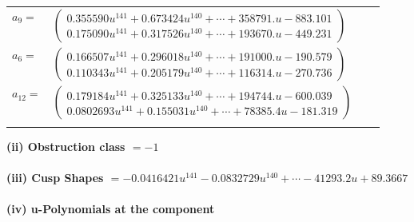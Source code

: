 \documentclass[1p]{elsarticle_modified}
\theoremstyle{definition}
\begin{document}
\begin{tabular}{m{7pt} m{180pt} m{7pt} m{180pt} }
\flushright $a_{9}=$&$\begin{pmatrix}0.355590 u^{141}+0.673424 u^{140}+\cdots+358791. u-883.101\\0.175090 u^{141}+0.317526 u^{140}+\cdots+193670. u-449.231\end{pmatrix}$ \\
\flushright $a_{6}=$&$\begin{pmatrix}0.166507 u^{141}+0.296018 u^{140}+\cdots+191000. u-190.579\\0.110343 u^{141}+0.205179 u^{140}+\cdots+116314. u-270.736\end{pmatrix}$ \\
\flushright $a_{12}=$&$\begin{pmatrix}0.179184 u^{141}+0.325133 u^{140}+\cdots+194744. u-600.039\\0.0802693 u^{141}+0.155031 u^{140}+\cdots+78385.4 u-181.319\end{pmatrix}$\\&\end{tabular}
\flushleft \textbf{(ii) Obstruction class $= -1$}\\~\\
\flushleft \textbf{(iii) Cusp Shapes $= -0.0416421 u^{141}-0.0832729 u^{140}+\cdots-41293.2 u+89.3667$}\\~\\
\newpage\renewcommand{\arraystretch}{1}
\flushleft \textbf{(iv) u-Polynomials at the component}\newline \\
\end{document}
